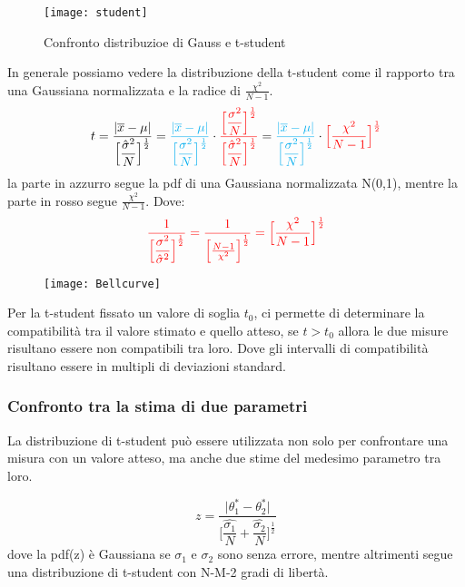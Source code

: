   
\begin{figure}[ht]
\vspace{0.1in}
\texttt{[image: student]}	
\centering
\vspace{0.1in}
\caption{Confronto distribuzioe di Gauss e t-student}
\end{figure}
In generale possiamo vedere la distribuzione della t-student come il rapporto tra una Gaussiana normalizzata e la radice di  $\frac{\chi^2}{N-1}$.
\begin{equation*}
	t = \dfrac{\vert \overline{x} - \mu \vert}{\Big [{\dfrac{\hat{\sigma}^2}{N}} \Big ]^{\frac{1}{2}}} = \textcolor{cyan}{\dfrac{\vert \overline{x} - \mu \vert}{\Big [{\dfrac{\sigma^2}{N}} \Big ]^{\frac{1}{2}}}} \cdot \textcolor{red}{\dfrac{\Big [ \dfrac{\sigma^2}{N} \Big]^{\frac{1}{2}}}{\Big [ \dfrac{\hat{\sigma}^2}{N} \Big]^{\frac{1}{2}}}} = \textcolor{cyan}{\dfrac{\vert \overline{x} - \mu \vert}{\Big [{\dfrac{\sigma^2}{N}} \Big ]^{\frac{1}{2}}}} \cdot \textcolor{red}{\Big [ \dfrac{\chi^2}{N-1} \Big ]^{\frac{1}{2}}}  
\end{equation*}
la parte in azzurro segue la pdf di una Gaussiana normalizzata N(0,1), mentre la parte in rosso segue $\frac{\chi^2}{N-1}$. Dove:
\begin{equation*}
	\textcolor{red}{\dfrac{1}{\Big [ \dfrac{\sigma^2}{\hat{\sigma}^2} \Big ]^{\frac{1}{2}}} = \dfrac{1}{\Big[  \frac{N-1}{\chi^2} \Big ]^{\frac{1}{2}} } = \Big [ \dfrac{\chi^2}{N-1} \Big ]^{\frac{1}{2}}  } 
\end{equation*}
\begin{wrapfigure}{r}{0.\textwidth}
\texttt{[image: Bellcurve]}	
\centering
\end{wrapfigure}
Per la t-student fissato un valore di soglia $t_0$, ci permette di determinare la compatibilit\`{a} tra il valore stimato e quello atteso, se $t>t_0$ allora le due misure risultano essere non compatibili tra loro. Dove gli intervalli di compatibilit\`{a} risultano essere in multipli di deviazioni standard.

\subsubsection{Confronto tra la stima di due parametri}

La distribuzione di t-student pu\`{o} essere utilizzata non solo per confrontare una misura con un valore atteso, ma anche due stime del medesimo parametro tra loro.

\begin{equation}
	z = \dfrac{\vert \theta^*_1 - \theta^*_2 \vert }{ \Big [\dfrac{\hat{\sigma_1}}{N} +\dfrac{\hat{\sigma_2}}{N} \Big ]^{\frac{1}{2}}}
\end{equation}
dove la pdf(z) \`{e} Gaussiana se $\sigma_1$ e $\sigma_2$ sono senza errore, mentre altrimenti segue una distribuzione di t-student con N-M-2 gradi di libert\`{a}.

